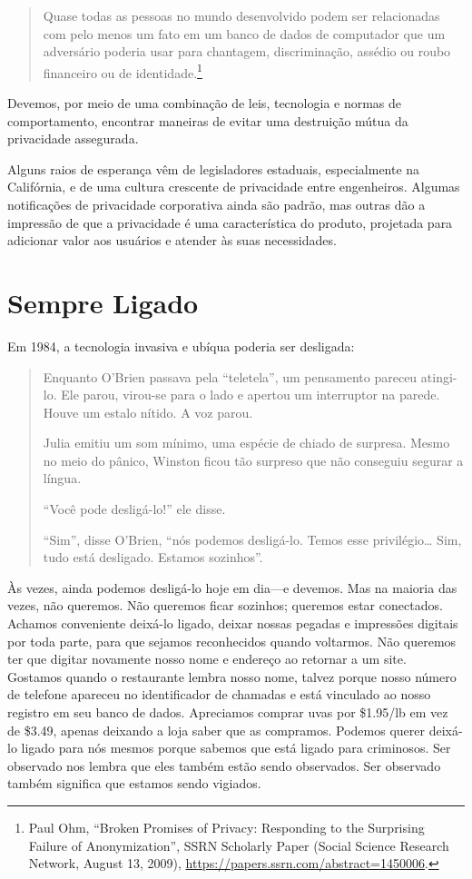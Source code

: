 \documentclass{book}
\begin{document}
\begin{quote}
Quase todas as pessoas no mundo desenvolvido podem ser relacionadas com pelo
menos um fato em um banco de dados de computador que um adversário poderia usar
para chantagem, discriminação, assédio ou roubo financeiro ou de 
identidade.\footnote{Paul Ohm, ``Broken Promises of Privacy: Responding to the
Surprising Failure of Anonymization'', SSRN Scholarly Paper (Social Science
Research Network, August 13, 2009), 
\url{https://papers.ssrn.com/abstract=1450006}.}
\end{quote}

Devemos, por meio de uma combinação de leis, tecnologia e normas de comportamento,
encontrar maneiras de evitar uma destruição mútua da privacidade assegurada.

Alguns raios de esperança vêm de legisladores estaduais, especialmente na
Califórnia, e de uma cultura crescente de privacidade entre engenheiros. Algumas
notificações de privacidade corporativa ainda são padrão, mas outras dão a
impressão de que a privacidade é uma característica do produto, projetada para
adicionar valor aos usuários e atender às suas necessidades.

\section{Sempre Ligado}
\label{cap3:quem-sempre}
Em 1984, a tecnologia invasiva e ubíqua poderia ser desligada:

\begin{quote}
Enquanto O'Brien passava pela ``teletela'', um pensamento pareceu atingi-lo.
Ele parou, virou-se para o lado e apertou um interruptor na parede. Houve um
estalo nítido. A voz parou.

Julia emitiu um som mínimo, uma espécie de chiado de surpresa. Mesmo no meio
do pânico, Winston ficou tão surpreso que não conseguiu segurar a língua.

``Você pode desligá-lo!'' ele disse.

``Sim'', disse O'Brien, ``nós podemos desligá-lo. Temos esse privilégio\ldots
Sim, tudo está desligado. Estamos sozinhos''.
\end{quote}

Às vezes, ainda podemos desligá-lo hoje em dia---e devemos. Mas na maioria das
vezes, não queremos. Não queremos ficar sozinhos; queremos estar conectados.
Achamos conveniente deixá-lo ligado, deixar nossas pegadas e impressões
digitais por toda parte, para que sejamos reconhecidos quando voltarmos. Não
queremos ter que digitar novamente nosso nome e endereço ao retornar a um site.
Gostamos quando o restaurante lembra nosso nome, talvez porque nosso número de
telefone apareceu no identificador de chamadas e está vinculado ao nosso registro
em seu banco de dados. Apreciamos comprar uvas por \$1.95/lb em vez de \$3.49,
apenas deixando a loja saber que as compramos. Podemos querer deixá-lo ligado
para nós mesmos porque sabemos que está ligado para criminosos. Ser observado
nos lembra que eles também estão sendo observados. Ser observado também
significa que estamos sendo vigiados.
\end{document}

